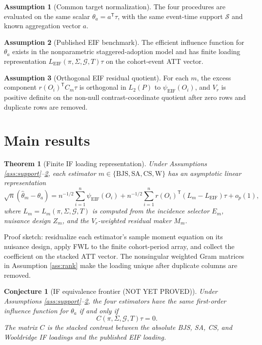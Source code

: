 \documentclass[11pt]{article}
\newcommand{\transpose}{\mathsf{T}}
\theoremstyle{definition}
\newtheorem{assumption}{Assumption}
\theoremstyle{plain}
\newtheorem{theorem}{Theorem}
\newtheorem{conjecture}{Conjecture}
\theoremstyle{remark}
\begin{document}
\begin{assumption}[Common target normalization]\label{ass:target}
The four procedures are evaluated on the same scalar
$\theta_a=a^\transpose\tau$, with the same event-time support $\mathcal S$
and known aggregation vector $a$.
\end{assumption}

\begin{assumption}[Published EIF benchmark]\label{ass:eif}
The efficient influence function for $\theta_a$ exists in the nonparametric
staggered-adoption model and has finite loading representation
$L_{\mathrm{EIF}}(\pi,\Sigma,\mathcal G,T)\tau$ on the cohort-event ATT
vector.
\end{assumption}

\begin{assumption}[Orthogonal EIF residual quotient]\label{ass:orthogonal}
For each $m$, the excess component
$r(O_i)^\transpose C_m\tau$ is orthogonal in $L_2(P)$ to
$\psi_{\mathrm{EIF}}(O_i)$, and $V_r$ is positive definite on the non-null
contrast-coordinate quotient after zero rows and duplicate rows are removed.
\end{assumption}

\section{Main results}
\begin{theorem}[Finite IF loading representation]\label{thm:loading}
Under Assumptions \ref{ass:support}--\ref{ass:eif}, each estimator
$m\in\{\mathrm{BJS},\mathrm{SA},\mathrm{CS},\mathrm{W}\}$ has an asymptotic
linear representation
\[
  \sqrt n(\widehat\theta_m-\theta_a)
  = n^{-1/2}\sum_{i=1}^n \psi_{\mathrm{EIF}}(O_i)
    + n^{-1/2}\sum_{i=1}^n r(O_i)^\transpose
      (L_m-L_{\mathrm{EIF}})\tau+o_p(1),
\]
where $L_m=L_m(\pi,\Sigma,\mathcal G,T)$ is computed from the incidence
selector $E_m$, nuisance design $Z_m$, and the $V_r$-weighted residual maker
$M_m$.
\end{theorem}
Proof sketch: residualize each estimator's sample moment equation on its
nuisance design, apply FWL to the finite cohort-period array, and collect the
coefficient on the stacked ATT vector.  The nonsingular weighted Gram matrices
in Assumption \ref{ass:rank} make the loading unique after duplicate columns
are removed.

\begin{conjecture}[IF equivalence frontier (NOT YET PROVED)]\label{conj:frontier}
Under Assumptions \ref{ass:support}--\ref{ass:eif}, the four estimators have
the same first-order influence function for $\theta_a$ if and only if
\[
  C(\pi,\Sigma,\mathcal G,T)\tau=0 .
\]
The matrix $C$ is the stacked contrast between the absolute BJS, SA, CS, and
Wooldridge IF loadings and the published EIF loading.
\end{conjecture}
\end{document}
